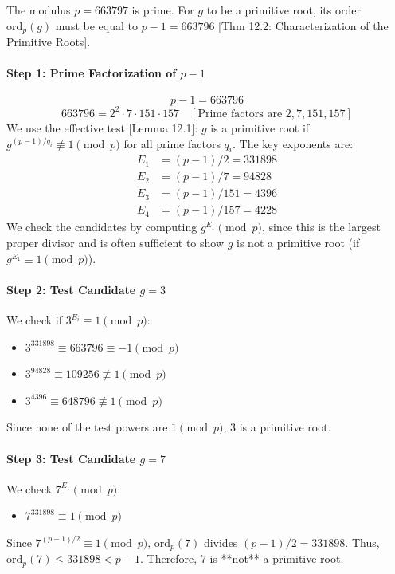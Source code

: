 \begin{solution}
The modulus $p=663797$ is prime. For $g$ to be a primitive root, its order $\mathrm{ord}_{p}(g)$ must be equal to $p-1 = 663796$ [Thm 12.2: Characterization of the Primitive Roots].

\paragraph{Step 1: Prime Factorization of $p-1$}
$$ p-1 = 663796 $$
$$ 663796 = 2^2 \cdot 7 \cdot 151 \cdot 157 \quad [\text{Prime factors are } 2, 7, 151, 157] \text{} $$
We use the effective test [Lemma 12.1]: $g$ is a primitive root if $g^{(p-1)/q_i} \not\equiv 1 \pmod{p}$ for all prime factors $q_i$. The key exponents are:
\begin{align*}
    E_1 &= (p-1)/2 = 331898 \\
    E_2 &= (p-1)/7 = 94828 \\
    E_3 &= (p-1)/151 = 4396 \\
    E_4 &= (p-1)/157 = 4228
\end{align*}
We check the candidates by computing $g^{E_1} \pmod{p}$, since this is the largest proper divisor and is often sufficient to show $g$ is not a primitive root (if $g^{E_1} \equiv 1 \pmod{p}$).

\paragraph{Step 2: Test Candidate $g=3$}
We check if $3^{E_i} \equiv 1 \pmod{p}$:
\begin{itemize}
    \item $3^{331898} \equiv 663796 \equiv -1 \pmod{p}$
    \item $3^{94828} \equiv 109256 \not\equiv 1 \pmod{p}$
    \item $3^{4396} \equiv 648796 \not\equiv 1 \pmod{p}$
\end{itemize}
Since none of the test powers are $1 \pmod{p}$, $3$ is a primitive root.

\paragraph{Step 3: Test Candidate $g=7$}
We check $7^{E_1} \pmod{p}$:
\begin{itemize}
    \item $7^{331898} \equiv 1 \pmod{p}$
\end{itemize}
Since $7^{(p-1)/2} \equiv 1 \pmod{p}$, $\mathrm{ord}_{p}(7)$ divides $(p-1)/2 = 331898$. Thus, $\mathrm{ord}_{p}(7) \le 331898 < p-1$.
Therefore, $7$ is **not** a primitive root.


\end{solution}
